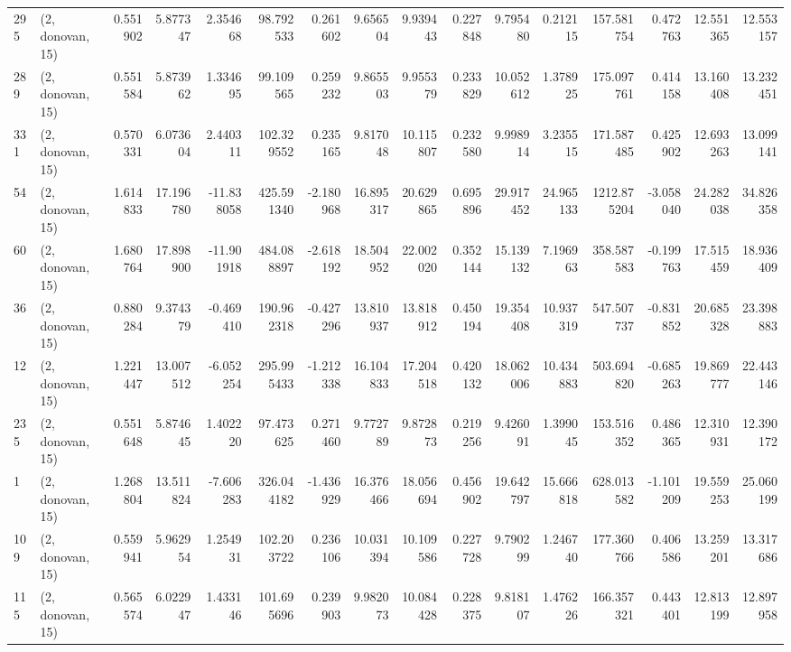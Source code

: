 \begin{tabular}{llrrrrrrrrrrrrrr}
295 &  (2, donovan, 15) &   0.551902 &   5.877347 &   2.354668 &    98.792533 &   0.261602 &   9.656504 &   9.939443 &  0.227848 &   9.795480 &   0.212115 &   157.581754 &  0.472763 &  12.551365 &  12.553157 \\
289 &  (2, donovan, 15) &   0.551584 &   5.873962 &   1.334695 &    99.109565 &   0.259232 &   9.865503 &   9.955379 &  0.233829 &  10.052612 &   1.378925 &   175.097761 &  0.414158 &  13.160408 &  13.232451 \\
331 &  (2, donovan, 15) &   0.570331 &   6.073604 &   2.440311 &   102.329552 &   0.235165 &   9.817048 &  10.115807 &  0.232580 &   9.998914 &   3.235515 &   171.587485 &  0.425902 &  12.693263 &  13.099141 \\
54  &  (2, donovan, 15) &   1.614833 &  17.196780 & -11.838058 &   425.591340 &  -2.180968 &  16.895317 &  20.629865 &  0.695896 &  29.917452 &  24.965133 &  1212.875204 & -3.058040 &  24.282038 &  34.826358 \\
60  &  (2, donovan, 15) &   1.680764 &  17.898900 & -11.901918 &   484.088897 &  -2.618192 &  18.504952 &  22.002020 &  0.352144 &  15.139132 &   7.196963 &   358.587583 & -0.199763 &  17.515459 &  18.936409 \\
36  &  (2, donovan, 15) &   0.880284 &   9.374379 &  -0.469410 &   190.962318 &  -0.427296 &  13.810937 &  13.818912 &  0.450194 &  19.354408 &  10.937319 &   547.507737 & -0.831852 &  20.685328 &  23.398883 \\
12  &  (2, donovan, 15) &   1.221447 &  13.007512 &  -6.052254 &   295.995433 &  -1.212338 &  16.104833 &  17.204518 &  0.420132 &  18.062006 &  10.434883 &   503.694820 & -0.685263 &  19.869777 &  22.443146 \\
235 &  (2, donovan, 15) &   0.551648 &   5.874645 &   1.402220 &    97.473625 &   0.271460 &   9.772789 &   9.872873 &  0.219256 &   9.426091 &   1.399045 &   153.516352 &  0.486365 &  12.310931 &  12.390172 \\
1   &  (2, donovan, 15) &   1.268804 &  13.511824 &  -7.606283 &   326.044182 &  -1.436929 &  16.376466 &  18.056694 &  0.456902 &  19.642797 &  15.666818 &   628.013582 & -1.101209 &  19.559253 &  25.060199 \\
109 &  (2, donovan, 15) &   0.559941 &   5.962954 &   1.254931 &   102.203722 &   0.236106 &  10.031394 &  10.109586 &  0.227728 &   9.790299 &   1.246740 &   177.360766 &  0.406586 &  13.259201 &  13.317686 \\
115 &  (2, donovan, 15) &   0.565574 &   6.022947 &   1.433146 &   101.695696 &   0.239903 &   9.982073 &  10.084428 &  0.228375 &   9.818107 &   1.476226 &   166.357321 &  0.443401 &  12.813199 &  12.897958 \\

\end{tabular}
